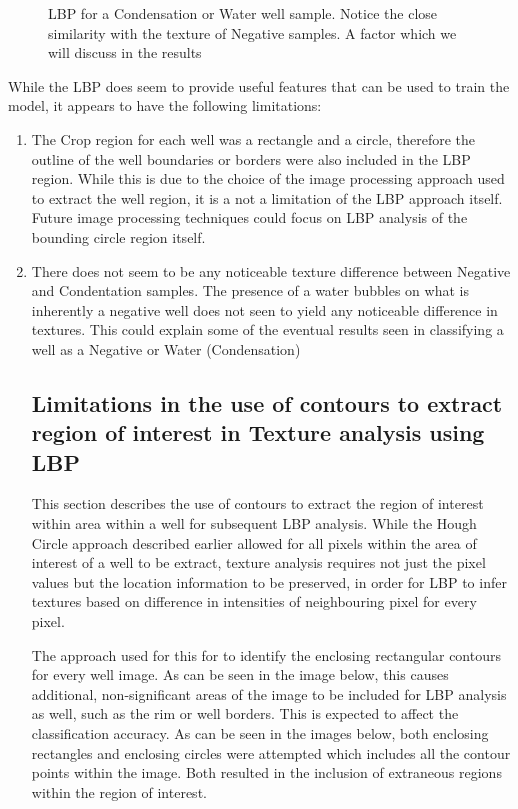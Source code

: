 \documentclass[a4paper,twoside,12pt]{report}
\begin{document}
\begin{figure} [!htbp]
\centering
\caption[LBP for a Condendation or Water well sample] {LBP for a Condensation or Water well sample.  Notice the close similarity with the texture of Negative samples.  A factor which we will discuss in the results}
\end{figure}

While the LBP does seem to provide useful features that can be used to train the model, it appears to have the following limitations: 

\begin{enumerate}
\item The Crop region for each well was a rectangle and a circle, therefore the outline of the well boundaries or borders were also included in the LBP region.  While this is due to the choice of the image processing approach used to extract the well region, it is a not a limitation of the LBP approach itself.  Future image processing techniques could focus on LBP analysis of the bounding circle region itself.     

\item There does not seem to be any noticeable texture difference between Negative and Condentation samples.    The presence of a water bubbles on what is inherently a negative well does not seen to yield any noticeable difference in textures.  This could explain some of the eventual results seen in classifying a well as a Negative or Water (Condensation)

\subsection{Limitations in the use of contours to extract region of interest in Texture analysis using LBP} 

This section describes the use of contours to extract the region of interest within area within a well for subsequent LBP analysis.   While the Hough Circle approach described earlier allowed for all pixels within the area of interest of a well to be extract, texture analysis requires not just the pixel values but the location information to be preserved, in order for LBP to infer textures based on difference in intensities of neighbouring pixel for every pixel.   

The approach used for this for to identify the enclosing rectangular contours for every well image.    As can be seen in the image below, this causes additional, non-significant areas of the image to be included for LBP analysis as well, such as the rim or well borders.   This is expected to affect the classification accuracy. 
As can be seen in the images below, both enclosing rectangles and enclosing circles were attempted which includes all the contour points within the image.   Both resulted in the inclusion of extraneous regions within the region of interest. 


\end{enumerate}
\end{document}
